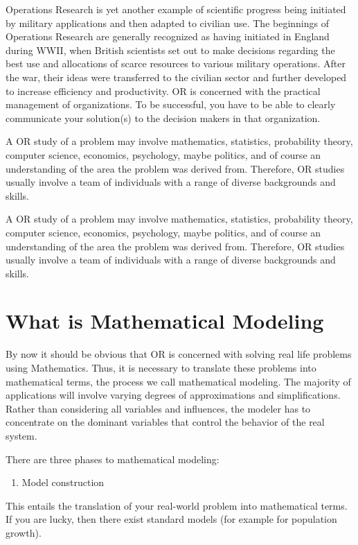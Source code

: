 \documentclass[10pt]{article}
\begin{document}
Operations Research is yet another example of scientific progress being initiated by military applications and then adapted to civilian use. The beginnings of Operations Research are generally recognized as having initiated in England during WWII, when British scientists set out to make decisions regarding the best use and allocations of scarce resources to various military operations. After the war, their ideas were transferred to the civilian sector and further developed to increase efficiency and productivity. OR is concerned with the practical management of organizations. To be successful, you have to be able to clearly communicate your solution(s) to the decision makers in that organization.

A OR study of a problem may involve mathematics, statistics, probability theory, computer science, economics, psychology, maybe politics, and of course an understanding of the area the problem was derived from. Therefore, OR studies usually involve a team of individuals with a range of diverse backgrounds and skills.

A OR study of a problem may involve mathematics, statistics, probability theory, computer science, economics, psychology, maybe politics, and of course an understanding of the area the problem was derived from. Therefore, OR studies usually involve a team of individuals with a range of diverse backgrounds and skills.

\section{What is Mathematical Modeling}
By now it should be obvious that OR is concerned with solving real life problems using Mathematics. Thus, it is necessary to translate these problems into mathematical terms, the process we call mathematical modeling. The majority of applications will involve varying degrees of approximations and simplifications. Rather than considering all variables and influences, the modeler has to concentrate on the dominant variables that control the behavior of the real system.

There are three phases to mathematical modeling:

\begin{enumerate}
  \item Model construction
\end{enumerate}
This entails the translation of your real-world problem into mathematical terms. If you are lucky, then there exist standard models (for example for population growth).
\end{document}
